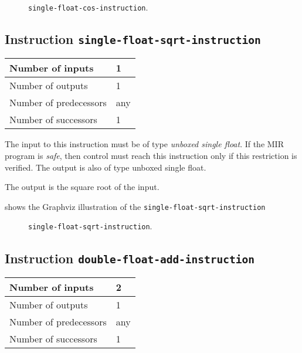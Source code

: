 \begin{figure}
\begin{center}
\end{center}
\caption{\label{fig-single-float-cos-instruction}
\texttt{single-float-cos-instruction}.}
\end{figure}

\subsection{Instruction \texttt{single-float-sqrt-instruction}}
\label{mir-instruction-single-float-div}

\begin{tabular}{|l|l|}
\hline
Number of inputs & 1\\
\hline
Number of outputs & 1\\
\hline
Number of predecessors & any\\
\hline
Number of successors & 1\\
\hline
\end{tabular}

The input to this instruction must be of type \emph{unboxed single
  float}.  If the MIR program is \emph{safe}, then control must reach
this instruction only if this restriction is verified.  The output is
also of type unboxed single float.

The output is the square root of the input.

 shows the Graphviz illustration of the
\texttt{single-float-sqrt-instruction}

\begin{figure}
\begin{center}
\end{center}
\caption{\label{fig-single-float-sqrt-instruction}
\texttt{single-float-sqrt-instruction}.}
\end{figure}

\subsection{Instruction \texttt{double-float-add-instruction}}
\label{mir-instruction-double-float-add}

\begin{tabular}{|l|l|}
\hline
Number of inputs & 2\\
\hline
Number of outputs & 1\\
\hline
Number of predecessors & any\\
\hline
Number of successors & 1\\
\hline
\end{tabular}

